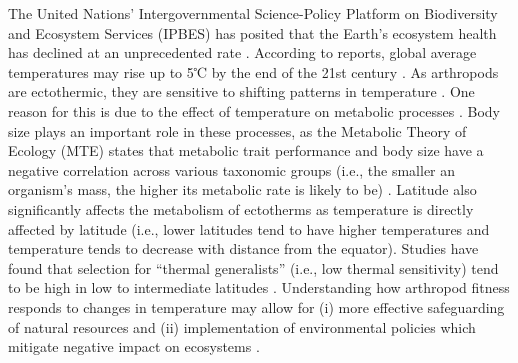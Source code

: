 \documentclass[11pt]{article}
\begin{document}
\begin{flushleft}
The United Nations’ Intergovernmental Science-Policy Platform on Biodiversity and Ecosystem Services (IPBES) has posited that the Earth’s ecosystem health has declined at an unprecedented rate \citep{diaz2019summary}. According to reports, global average temperatures may rise up to 5℃ by the end of the 21st century \citep{tollefson2020hot}. As arthropods are ectothermic, they are sensitive to shifting patterns in temperature \citep{doi:10.1073/pnas.2002543117}. One reason for this is due to the effect of temperature on metabolic processes \citep{schulte2015effects}. Body size plays an important role in these processes, as the Metabolic Theory of Ecology (MTE) states that metabolic trait performance and body size have a negative correlation across various taxonomic groups (i.e., the smaller an organism's mass, the higher its metabolic rate is likely to be) \citep{frazier2006thermodynamics}. Latitude also significantly affects the metabolism of ectotherms \citep{delong2018habitat} as temperature is directly affected by latitude (i.e., lower latitudes tend to have higher temperatures and temperature tends to decrease with distance from the equator). Studies have found that selection for “thermal generalists” (i.e., low thermal sensitivity) tend to be high in low to intermediate latitudes \citep{kontopoulos2020adaptive}. Understanding how arthropod fitness responds to changes in temperature may allow for (i) more effective safeguarding of natural resources and (ii) implementation of environmental policies which mitigate negative impact on ecosystems \citep{smith2019community}. 
\linebreak 


\end{flushleft}
\end{document}
